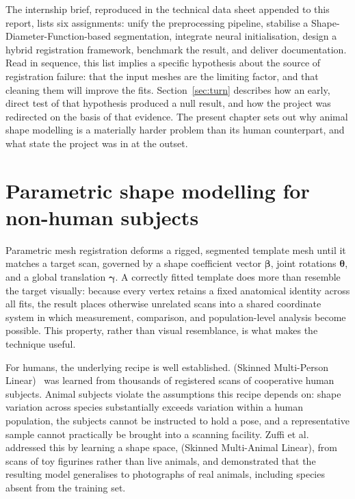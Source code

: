 The internship brief, reproduced in the technical data sheet appended to this
report, lists six assignments: unify the preprocessing pipeline, stabilise a
Shape-Diameter-Function-based segmentation, integrate neural initialisation,
design a hybrid registration framework, benchmark the result, and deliver
documentation. Read in sequence, this list implies a specific hypothesis about
the source of registration failure: that the input meshes are the limiting
factor, and that cleaning them will improve the fits. Section~\ref{sec:turn}
describes how an early, direct test of that hypothesis produced a null result,
and how the project was redirected on the basis of that evidence. The present
chapter sets out why animal shape modelling is a materially harder problem than
its human counterpart, and what state the project was in at the outset.

\section{Parametric shape modelling for non-human subjects}

Parametric mesh registration deforms a rigged, segmented template mesh until it
matches a target scan, governed by a shape coefficient vector $\bm\beta$, joint
rotations $\bm\theta$, and a global translation $\bm\gamma$. A correctly fitted
template does more than resemble the target visually: because every vertex
retains a fixed anatomical identity across all fits, the result places
otherwise unrelated scans into a shared coordinate system in which
measurement, comparison, and population-level analysis become possible. This
property, rather than visual resemblance, is what makes the technique useful.

For humans, the underlying recipe is well established.  (Skinned
Multi-Person Linear)~\cite{smpl} was learned from thousands of registered scans
of cooperative human subjects. Animal
subjects violate the assumptions this recipe depends on: shape variation across
species substantially exceeds variation within a human population, the
subjects cannot be instructed to hold a pose, and a representative sample
cannot practically be brought into a scanning facility. Zuffi et
al.~\cite{smal} addressed this by learning a shape space,  (Skinned
Multi-Animal Linear), from
scans of toy figurines rather than live animals, and demonstrated that the
resulting model generalises to photographs of real animals, including species
absent from the training set.

